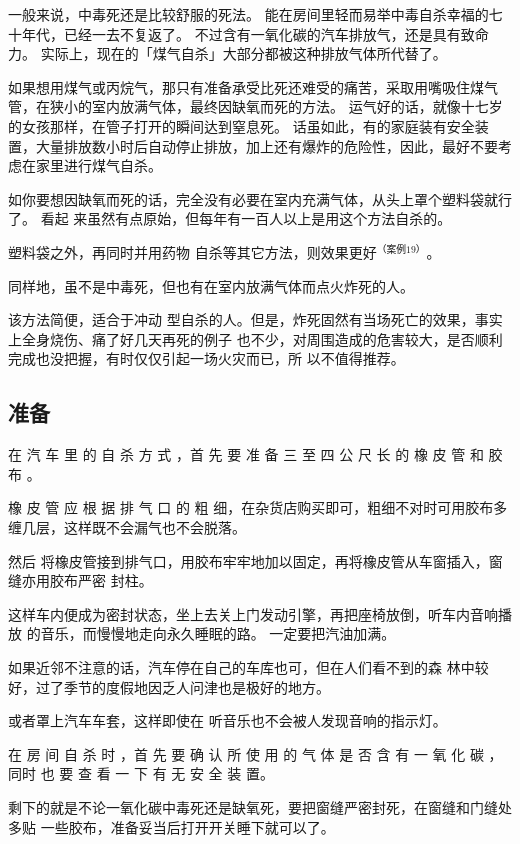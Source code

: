 \documentclass[UTF8]{ctexart}
\begin{document}
一般来说，中毒死还是比较舒服的死法。
能在房间里轻而易举中毒自杀幸福的七十年代，已经一去不复返了。 
不过含有一氧化碳的汽车排放气，还是具有致命力。
实际上，现在的「煤气自杀」大部分都被这种排放气体所代替了。

如果想用煤气或丙烷气，那只有准备承受比死还难受的痛苦，采取用嘴吸住煤气管，在狭小的室内放满气体，最终因缺氧而死的方法。
运气好的话，就像十七岁的女孩那样，在管子打开的瞬间达到窒息死。
话虽如此，有的家庭装有安全装置，大量排放数小时后自动停止排放，加上还有爆炸的危险性，因此，最好不要考虑在家里进行煤气自杀。

如你要想因缺氧而死的话，完全没有必要在室内充满气体，从头上罩个塑料袋就行了。
看起 来虽然有点原始，但每年有一百人以上是用这个方法自杀的。

塑料袋之外，再同时并用药物 自杀等其它方法，则效果更好$^{（案例 19）}$。
 
同样地，虽不是中毒死，但也有在室内放满气体而点火炸死的人。

该方法简便，适合于冲动 型自杀的人。但是，炸死固然有当场死亡的效果，事实上全身烧伤、痛了好几天再死的例子 也不少，对周围造成的危害较大，是否顺利完成也没把握，有时仅仅引起一场火灾而已，所 以不值得推荐。

\subsection{准备}

在 汽 车 里 的 自 杀 方 式 ，首 先 要 准 备 三 至 四 公 尺 长 的 橡 皮 管 和 胶 布 。

橡 皮 管 应 根 据 排 气 口 的 粗 细，在杂货店购买即可，粗细不对时可用胶布多缠几层，这样既不会漏气也不会脱落。

然后 将橡皮管接到排气口，用胶布牢牢地加以固定，再将橡皮管从车窗插入，窗缝亦用胶布严密 封柱。

这样车内便成为密封状态，坐上去关上门发动引擎，再把座椅放倒，听车内音响播放 的音乐，而慢慢地走向永久睡眠的路。 一定要把汽油加满。

如果近邻不注意的话，汽车停在自己的车库也可，但在人们看不到的森 林中较好，过了季节的度假地因乏人问津也是极好的地方。

或者罩上汽车车套，这样即使在 听音乐也不会被人发现音响的指示灯。

在 房 间 自 杀 时 ，首 先 要 确 认 所 使 用 的 气 体 是 否 含 有 一 氧 化 碳 ，同时 也 要 查 看 一 下 有 无 安 全 装 置。

剩下的就是不论一氧化碳中毒死还是缺氧死，要把窗缝严密封死，在窗缝和门缝处多贴 一些胶布，准备妥当后打开开关睡下就可以了。
\end{document}
